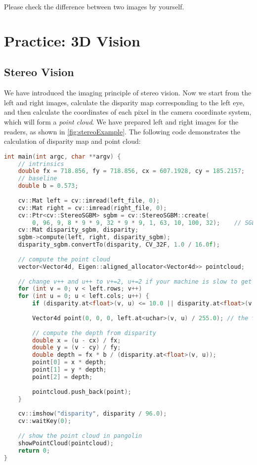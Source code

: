 Please check the difference between two images by yourself.

\section{Practice: 3D Vision}
\subsection{Stereo Vision}
We have introduced the imaging principle of stereo vision. Now we start from the left and right images, calculate the disparity map corresponding to the left eye, and then calculate the coordinates of each pixel in the camera coordinate system, which will form a \textit{point cloud}. We have prepared left and right images for the readers, as shown in \autoref {fig:stereoExample}. The following code demonstrates the calculation of disparity map and point cloud:

\begin{lstlisting}[language=C++,caption=slambook/ch5/stereoVision/stereoVision.cpp (Part)]
int main(int argc, char **argv) {
    // intrinsics
    double fx = 718.856, fy = 718.856, cx = 607.1928, cy = 185.2157;
    // baseline
    double b = 0.573;
    
    cv::Mat left = cv::imread(left_file, 0);
    cv::Mat right = cv::imread(right_file, 0);
    cv::Ptr<cv::StereoSGBM> sgbm = cv::StereoSGBM::create(
        0, 96, 9, 8 * 9 * 9, 32 * 9 * 9, 1, 63, 10, 100, 32);    // SGBM is senstive to parameters
    cv::Mat disparity_sgbm, disparity;
    sgbm->compute(left, right, disparity_sgbm);
    disparity_sgbm.convertTo(disparity, CV_32F, 1.0 / 16.0f);
    
    // compute the point cloud
    vector<Vector4d, Eigen::aligned_allocator<Vector4d>> pointcloud;
    
    // change v++ and u++ to v+=2, u+=2 if your machine is slow to get a sparser cloud
    for (int v = 0; v < left.rows; v++)
    for (int u = 0; u < left.cols; u++) {
        if (disparity.at<float>(v, u) <= 10.0 || disparity.at<float>(v, u) >= 96.0) continue;
        
        Vector4d point(0, 0, 0, left.at<uchar>(v, u) / 255.0); // the first three dimensions are xyz, the 4-th is the color
        
        // compute the depth from disparity
        double x = (u - cx) / fx;
        double y = (v - cy) / fy;
        double depth = fx * b / (disparity.at<float>(v, u));
        point[0] = x * depth;
        point[1] = y * depth;
        point[2] = depth;
        
        pointcloud.push_back(point);
    }
    
    cv::imshow("disparity", disparity / 96.0);
    cv::waitKey(0);
    
    // show the point cloud in pangolin
    showPointCloud(pointcloud);
    return 0;
}
\end{lstlisting}

